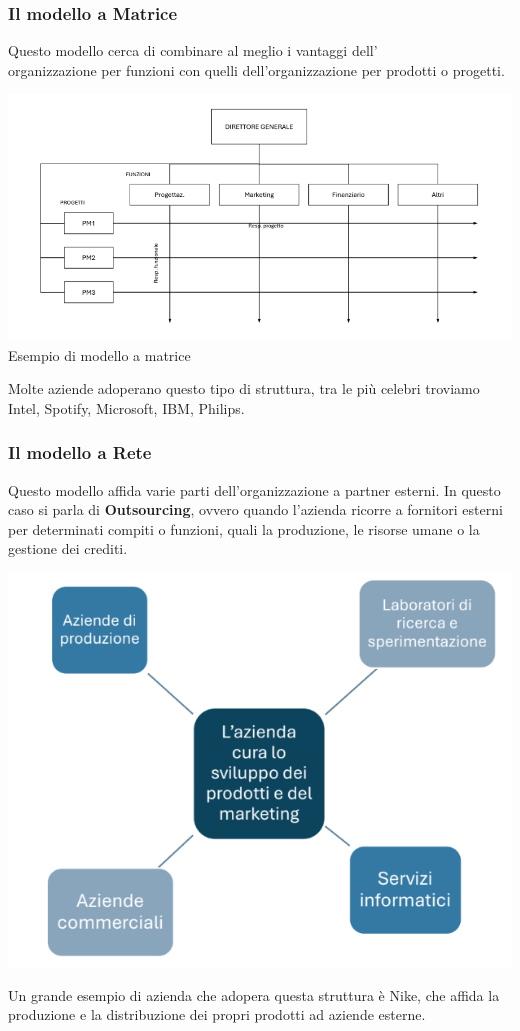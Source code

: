 \documentclass[14pt]{extarticle}
\begin{document}
\subsubsection{Il modello a Matrice}

Questo modello cerca di combinare al meglio i vantaggi dell' \\ 
organizzazione per funzioni con quelli dell'organizzazione per prodotti o
progetti.

\begin{center}
    \includegraphics[scale=0.60]{images/modello_matrice.png}
    Esempio di modello a matrice
\end{center}
Molte aziende adoperano questo tipo di struttura, tra le più celebri troviamo
Intel, Spotify, Microsoft, IBM, Philips.

\subsubsection{Il modello a Rete}

Questo modello affida varie parti dell'organizzazione a partner esterni. In
questo caso si parla di \textbf{Outsourcing}, ovvero quando l'azienda ricorre a
fornitori esterni per determinati compiti o funzioni, quali la produzione, le
risorse umane o la gestione dei crediti.

\begin{center}
    \includegraphics[scale=0.80]{images/modello_rete.png}
\end{center}
Un grande esempio di azienda che adopera questa struttura è Nike, che affida la
produzione e la distribuzione dei propri prodotti ad aziende esterne.
\end{document}
